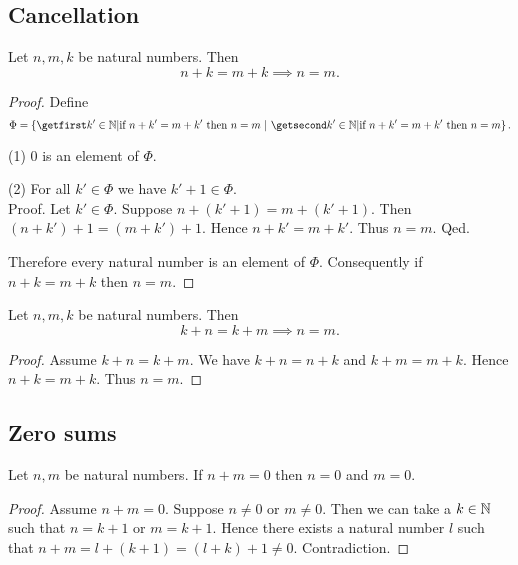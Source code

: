 \documentclass[../arithmetic.tex]{subfiles}
\begin{document}
  \subsection*{Cancellation}

  \begin{forthel}
    \begin{proposition}
      Let $n, m, k$ be natural numbers.
      Then \[ n + k = m + k \implies n = m. \]
    \end{proposition}
    \begin{proof}
      Define \[ \Phi = \class{k' \in \Nat | \text{if $n + k' = m + k'$ then
      $n = m$}}. \]

      (1) $0$ is an element of $\Phi$.

      (2) For all $k' \in \Phi$ we have $k' + 1 \in \Phi$. \\
      Proof.
        Let $k' \in \Phi$.
        Suppose $n + (k' + 1) = m + (k' + 1)$.
        Then $(n + k') + 1 = (m + k') + 1$.
        Hence $n + k' = m + k'$.
        Thus $n = m$.
      Qed.

      Therefore every natural number is an element of $\Phi$.
      Consequently if $n + k = m + k$ then $n = m$.
    \end{proof}
  \end{forthel}

  \begin{forthel}
    \begin{corollary}
      Let $n, m, k$ be natural numbers.
      Then \[ k + n = k + m \implies n = m. \]
    \end{corollary}
    \begin{proof}
      Assume $k + n = k + m$.
      We have $k + n = n + k$ and $k + m = m + k$.
      Hence $n + k = m + k$.
      Thus $n = m$.
    \end{proof}
  \end{forthel}


  \subsection*{Zero sums}

  \begin{forthel}
    \begin{proposition}
      Let $n, m$ be natural numbers.
      If $n + m = 0$ then $n = 0$ and $m = 0$.
    \end{proposition}
    \begin{proof}
      Assume $n + m = 0$.
      Suppose $n \neq 0$ or $m \neq 0$.
      Then we can take a $k \in \mathbb{N}$ such that $n = k + 1$ or $m = k + 1$.
      Hence there exists a natural number $l$ such that
      $n + m
        = l + (k + 1)
        = (l + k) + 1
        \neq 0$.
      Contradiction.
    \end{proof}
  \end{forthel}
\end{document}
